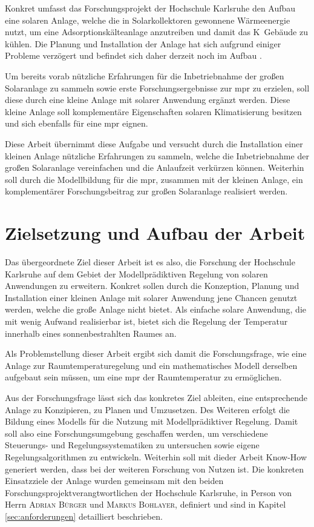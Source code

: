 Konkret umfasst das Forschungsprojekt der Hochschule Karlsruhe den Aufbau eine solaren Anlage, welche die in Solarkollektoren gewonnene Wärmeenergie nutzt, um eine Adsorptionskälteanlage anzutreiben und damit das K~Gebäude zu kühlen. Die Planung und Installation der Anlage hat sich aufgrund einiger Probleme verzögert und befindet sich daher derzeit noch im Aufbau \cite{hska}.

Um bereits vorab nützliche Erfahrungen für die Inbetriebnahme der großen Solaranlage zu sammeln sowie erste Forschungsergebnisse zur \acrlong{mpr} zu erzielen, soll diese durch eine kleine Anlage mit solarer Anwendung ergänzt werden. Diese kleine Anlage soll komplementäre Eigenschaften solaren Klimatisierung besitzen und sich ebenfalls für eine \acrlong{mpr} eignen.

Diese Arbeit übernimmt diese Aufgabe und versucht durch die Installation einer kleinen Anlage nützliche Erfahrungen zu sammeln, welche die Inbetriebnahme der großen Solaranlage vereinfachen und die Anlaufzeit verkürzen können. Weiterhin soll durch die Modellbildung für die \acrlong{mpr}, zusammen mit der kleinen Anlage, ein komplementärer Forschungsbeitrag zur großen Solaranlage realisiert werden.

\section{Zielsetzung und Aufbau der Arbeit}
\label{sec:ziel}

Das übergeordnete Ziel dieser Arbeit ist es also, die Forschung der Hochschule Karlsruhe auf dem Gebiet der Modellprädiktiven Regelung von solaren Anwendungen zu erweitern.
Konkret sollen durch die Konzeption, Planung und Installation einer kleinen Anlage mit solarer Anwendung jene Chancen genutzt werden, welche die große Anlage nicht bietet.
Als einfache solare Anwendung, die mit wenig Aufwand realisierbar ist, bietet sich die Regelung der Temperatur innerhalb eines sonnenbestrahlten Raumes an.

Als Problemstellung dieser Arbeit ergibt sich damit die Forschungsfrage, wie eine Anlage zur Raumtemperaturegelung und ein mathematisches Modell derselben aufgebaut sein müssen, um eine \acrlong{mpr} der Raumtemperatur zu ermöglichen.

Aus der Forschungsfrage lässt sich das konkretes Ziel ableiten, eine entsprechende Anlage zu Konzipieren, zu Planen und Umzusetzen. Des Weiteren erfolgt die Bildung eines Modells für die Nutzung mit Modellprädiktiver Regelung.
Damit soll also eine Forschungsumgebung geschaffen werden, um verschiedene Steuerungs- und Regelungssystematiken zu untersuchen sowie eigene Regelungsalgorithmen zu entwickeln. Weiterhin soll mit dieder Arbeit Know-How generiert werden, dass bei der weiteren Forschung von Nutzen ist. Die konkreten Einsatzziele der Anlage wurden gemeinsam mit den beiden Forschungsprojektverangtwortlichen der Hochschule Karlsruhe, in Person von Herrn \textsc{Adrian Bürger} und \textsc{Markus Bohlayer}, definiert und sind in Kapitel \ref{sec:anforderungen} detailliert beschrieben.


